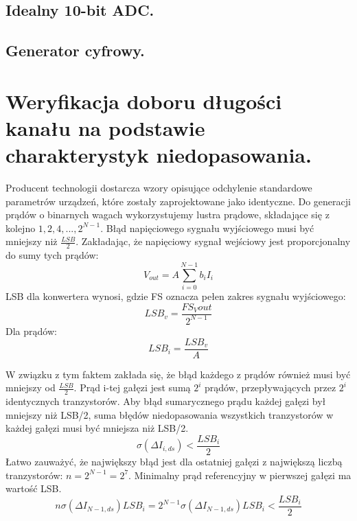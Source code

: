 \documentclass[10pt,a4paper]{report}
\theoremstyle{definition}
\theoremstyle{definition}
\theoremstyle{definition}
\theoremstyle{definition}
\theoremstyle{definition}
\begin{document}
{	\section{Idealny 10-bit ADC.}
	\section{Generator cyfrowy.}
	
	\chapter{Weryfikacja doboru długości kanału na podstawie charakterystyk niedopasowania.}
	{	Producent technologii dostarcza wzory opisujące odchylenie standardowe parametrów urządzeń, które zostały zaprojektowane jako identyczne. Do generacji prądów o binarnych wagach wykorzystujemy lustra prądowe, składające się z kolejno $1, 2, 4,..., 2^{N-1}$. Błąd napięciowego sygnału wyjściowego musi być mniejszy niż $\frac{LSB}{2}$. Zakładając, że napięciowy sygnał wejściowy jest proporcjonalny do sumy tych prądów:
		\begin{equation}
		V_{out} = A \sum_{i=0}^{N-1} b_{i}I_{i}
		\end{equation}
		LSB dla konwertera wynosi, gdzie FS oznacza pełen zakres sygnału wyjściowego:
		\begin{equation}
		LSB_v = \frac{FS_Vout}{2^{N-1}}
		\end{equation}
		Dla prądów:
		\begin{equation}
		LSB_i = \frac{LSB_v}{A}
		\end{equation}
		
		W związku z tym faktem zakłada się, że błąd każdego z prądów również musi być mniejszy od $\frac{LSB}{2}$. Prąd i-tej gałęzi jest sumą $2^{i}$ prądów, przepływających przez $2^{i}$ identycznych tranzystorów. Aby błąd sumarycznego prądu każdej gałęzi był mniejszy niż LSB/2, suma błędów niedopasowania wszystkich tranzystorów w każdej gałęzi musi być mniejsza niż LSB/2. 
		\begin{equation}
		\sigma \left( \Delta I_{i,ds} \right) < \frac{LSB_i}{2}
		\end{equation}
		Łatwo zauważyć, że największy błąd jest dla ostatniej gałęzi z największą liczbą tranzystorów: $n=2^{N-1}=2^7$. Minimalny prąd referencyjny w pierwszej gałęzi ma wartość LSB.
		\begin{equation}
		n \sigma \left( \Delta I_{N-1,ds} \right) LSB_i = 2^{N-1} \sigma \left( \Delta I_{N-1,ds} \right) LSB_i < \frac{LSB_i}{2}
		\end{equation}
		
}}
\end{document}
